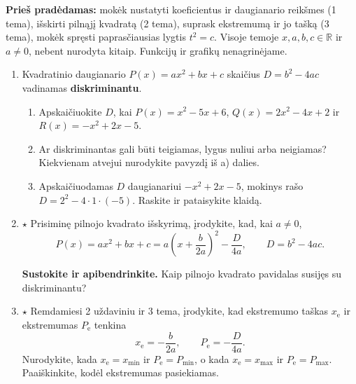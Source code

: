 \documentclass[12pt,a4paper]{article}
\begin{document}
\textbf{Prieš pradėdamas:} mokėk nustatyti koeficientus ir daugianario reikšmes (1 tema), išskirti pilnąjį kvadratą (2 tema), suprask ekstremumą ir jo tašką (3 tema), mokėk spręsti paprasčiausias lygtis $t^2=c$. Visoje temoje $x,a,b,c\in\mathbb R$ ir $a\ne0$, nebent nurodyta kitaip. Funkcijų ir grafikų nenagrinėjame.
\begin{enumerate}
\item Kvadratinio daugianario $P(x)=ax^2+bx+c$ skaičius $D=b^2-4ac$ vadinamas \textbf{diskriminantu}.
\begin{enumerate}
\item Apskaičiuokite $D$, kai $P(x)=x^2-5x+6$, $Q(x)=2x^2-4x+2$ ir $R(x)=-x^2+2x-5$.
\item Ar diskriminantas gali būti teigiamas, lygus nuliui arba neigiamas? Kiekvienam atvejui nurodykite pavyzdį iš a) dalies.
\item Apskaičiuodamas $D$ daugianariui $-x^2+2x-5$, mokinys rašo $D=2^2-4\cdot1\cdot(-5)$. Raskite ir pataisykite klaidą.
\end{enumerate}
\item $\star$ Prisiminę pilnojo kvadrato išskyrimą, įrodykite, kad, kai $a\ne0$,
\[
P(x)=ax^2+bx+c=a\left(x+\frac{b}{2a}\right)^2-\frac{D}{4a},\qquad D=b^2-4ac.
\]
\par\medskip
\textbf{Sustokite ir apibendrinkite.} Kaip pilnojo kvadrato pavidalas susijęs su diskriminantu?
\item $\star$ Remdamiesi 2 uždaviniu ir 3 tema, įrodykite, kad ekstremumo taškas $x_{\mathrm e}$ ir ekstremumas $P_{\mathrm e}$ tenkina
\[
\boxed{x_{\mathrm e}=-\frac{b}{2a}},\qquad
\boxed{P_{\mathrm e}=-\frac{D}{4a}}.
\]
Nurodykite, kada $x_{\mathrm e}=x_{\min}$ ir $P_{\mathrm e}=P_{\min}$, o kada $x_{\mathrm e}=x_{\max}$ ir $P_{\mathrm e}=P_{\max}$. Paaiškinkite, kodėl ekstremumas pasiekiamas.


\end{enumerate}
\end{document}
